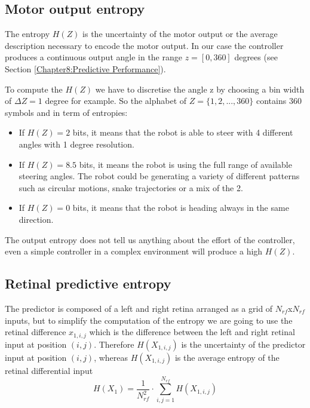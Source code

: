 \subsection{Motor output entropy}
The entropy $H(Z)$ is the uncertainty of the motor output or the average description
 necessary to encode the motor output.
In our case the controller produces a continuous output angle in the
 range $z=[0,360]$ degrees (see Section \ref{Chapter8:Predictive Performance}).

To compute the $H(Z)$ we have to discretise the angle z by choosing a bin width
 of $\Delta Z=1$ degree for example.
So the alphabet of $Z=\{1,2,...,360\}$ contains 360 symbols and in term of entropies:
\begin{itemize}
 \item If $H(Z)=2$ bits, it means that the robot is able to steer with 4 different angles with 1 degree resolution.
 \item If $H(Z)=8.5$ bits, it means the robot is using the full range of available steering angles.
The robot could be generating a variety of different patterns such as circular motions, snake trajectories or a mix of the 2.
 \item If $H(Z)=0$ bits, it means that the robot is heading always in the same direction.
\end{itemize}
The output entropy does not tell us anything about the effort of the controller, 
even a simple controller in a complex environment will produce a high $H(Z)$.
\subsection{Retinal predictive entropy}
The predictor is composed of a left and right retina arranged as a grid of
$N_{rf}$x$N_{rf}$ inputs, but to simplify the computation of the entropy
we are going to use the retinal difference $x_{1,i,j}$ which is the difference
between the left and right retinal input at position $(i,j)$.
Therefore $H(X_{1,i,j})$ is the uncertainty of the predictor input at
position $(i,j)$, whereas $H(X_{1,i,j})$ is the average entropy of the
retinal differential input
\begin{equation}
H(X_{1})=\frac{1}{N_{rf}^2}\cdot \sum_{i,j=1}^{N_{rf}} H(X_{1,i,j})
\end{equation}


